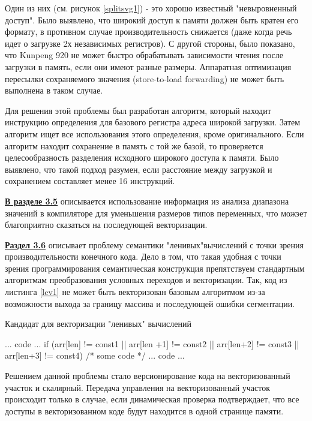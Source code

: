 Один из них (см. рисунок \ref{splitsvg1}) - это хорошо известный "невыровненный доступ". Было выявлено, что широкий доступ к памяти должен быть кратен его формату, в противном случае производительность снижается (даже когда речь идет о загрузке 2х независимых регистров). С другой стороны, было показано, что Kunpeng 920 не может быстро обрабатывать зависимости чтения после загрузки в память, если они имеют разные размеры. Аппаратная оптимизация пересылки сохраняемого значения (store-to-load forwarding) не может быть выполнена в таком случае.

Для решения этой проблемы был разработан алгоритм,
который находит инструкцию определения для базового регистра адреса широкой
загрузки. Затем алгоритм ищет все использования этого определения,
кроме оригинального. Если алгоритм находит сохранение в память с той же
базой, то проверяется целесообразность разделения исходного широкого доступа
к памяти. Было выявлено, что такой подход разумен, если расстояние
между загрузкой и сохранением составляет менее 16 инструкций.
 
 
 
 \underline{\textbf{В разделе 3.5}} описывается использование информация из анализа диапазона значений в компиляторе для уменьшения размеров типов переменных, что можэет благоприятно сказаться на последующей векторизации. 
 
  \underline{\textbf{Раздел 3.6}} описывает проблему семантики "ленивых"\phantom{ }вычислений с точки зрения производительности конечного кода. Дело в том, что такая удобная с точки зрения программирования семантическая конструкция препятствуем стандартным алгоритмам  преобразования условных переходов и векторизации. Так, код из листинга \ref{lcv1} не может быть векторизован базовым алгоритмом из-за возможности выхода за границу массива и последующей ошибки сегментации.
  
   \begin{ListingEnv}[!h]
  	\captiondelim{ } %
  	\caption{Кандидат для векторизации "ленивых"\phantom{ } вычислений}\label{lcv1}
  	
  	\begin{Verb}
	... code ...
	if (arr[len] != const1 || arr[len +1] != const2 
		|| arr[len+2] != const3  || arr[len+3] != const4) {
		/* some code */
	}
	... code ...
  	\end{Verb}
  \end{ListingEnv}
 
Решением данной проблемы стало версионирование кода на векторизованный участок и скалярный.  Передача управления на векторизованный участок происходит  только в случае, если динамическая проверка подтверждает, что все доступы в векторизованном коде будут находится в одной странице памяти.
 
